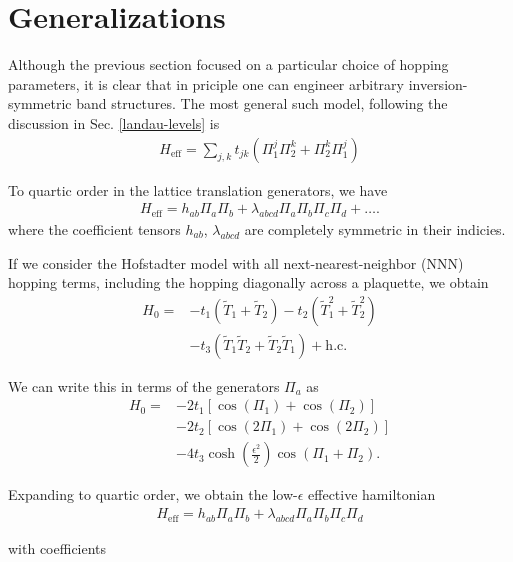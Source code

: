 \documentclass[aps,prb,twocolumn,letterpaper,twoside,nobalancelastpage,groupedaddress,amsmath,amssymb,floatfix,citeautoscript]{revtex4-1}
\begin{document}
\section{Generalizations}
Although the previous section focused on a particular choice of hopping parameters, it is clear that in priciple one can engineer arbitrary inversion-symmetric band structures. The most general such model, following the discussion in Sec. \ref{landau-levels} is
\begin{align*}
H_{\text{eff}} = \sum_{j,k}t_{jk}\left(\Pi_1^{j}\Pi_2^{k} + \Pi_2^{k}\Pi_1^{j}\right)
\end{align*}

To quartic order in the lattice translation generators, we have
\begin{align}
\label{general-quartic}
H_{\text{eff}} = h_{ab}\Pi_a \Pi_b + \lambda_{abcd} \Pi_a \Pi_b \Pi_c \Pi_d + \ldots.
\end{align}
where the coefficient tensors $h_{ab}$, $\lambda_{abcd}$ are completely symmetric in their indicies. 


If we consider the Hofstadter model with all next-nearest-neighbor (NNN) hopping terms, including the hopping diagonally across a plaquette, we obtain
\begin{align*}
H_0 = &-t_1 \left(\widetilde{T}_1 + \widetilde{T}_2\right)\nonumber - t_2 \left(\widetilde{T}_1^{2} + \widetilde{T}_2^{2}\right)\\ &- t_3 \left(\widetilde{T}_1\widetilde{T}_2 + \widetilde{T}_2 \widetilde{T}_1\right) + \text{h.c.}
\end{align*}

We can write this in terms of the generators $\Pi_a$ as
\begin{align*}
H_0 = &-2t_1 \left[\cos\left(\Pi_1\right) + \cos\left(\Pi_2\right)\right]\\ &-2t_2 \left[\cos\left(2\Pi_1\right)+\cos\left(2\Pi_2\right)\right]\\ &- 4t_3 \cosh\left(\frac{\epsilon^2}{2}\right)\cos\left(\Pi_1 + \Pi_2\right).
\end{align*}

Expanding to quartic order, we obtain the low-$\epsilon$ effective hamiltonian
\begin{align*}
H_{\text{eff}} = h_{ab}\Pi_a \Pi_b + \lambda_{abcd} \Pi_a \Pi_b \Pi_c \Pi_d 
\end{align*}

with coefficients
\end{document}
